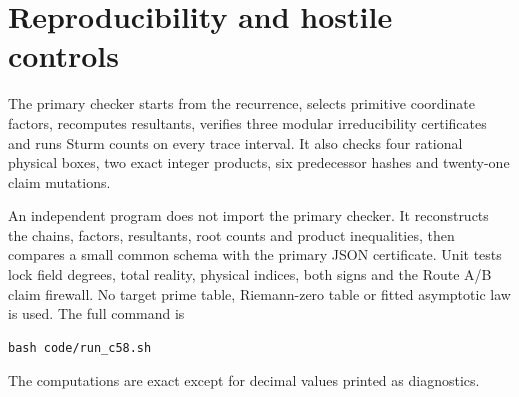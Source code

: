 \section{Reproducibility and hostile controls}

The primary checker starts from the recurrence, selects primitive coordinate
factors, recomputes resultants, verifies three modular irreducibility
certificates and runs Sturm counts on every trace interval.  It also checks
four rational physical boxes, two exact integer products, six predecessor
hashes and twenty-one claim mutations.

An independent program does not import the primary checker.  It reconstructs
the chains, factors, resultants, root counts and product inequalities, then
compares a small common schema with the primary JSON certificate.  Unit tests
lock field degrees, total reality, physical indices, both signs and the Route
A/B claim firewall.  No target prime table, Riemann-zero table or fitted
asymptotic law is used.  The full command is
\begin{verbatim}
bash code/run_c58.sh
\end{verbatim}
The computations are exact except for decimal values printed as diagnostics.
